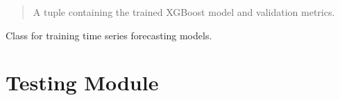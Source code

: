 \documentclass[letterpaper,10pt,english]{sphinxmanual}
\begin{document}
\begin{fulllineitems}
\begin{fulllineitems}
\begin{quote}
\begin{description}
\begin{itemize}
\end{itemize}

\sphinxAtStartPar
A tuple containing the trained XGBoost model and validation metrics.

\end{description}\end{quote}

\end{fulllineitems}


\end{fulllineitems}


\sphinxAtStartPar
Class for training time series forecasting models.

\sphinxstepscope


\section{Testing Module}
\label{\detokenize{docs/model_testing:module-model_testing}}\label{\detokenize{docs/model_testing:testing-module}}\label{\detokenize{docs/model_testing::doc}}
\end{document}
